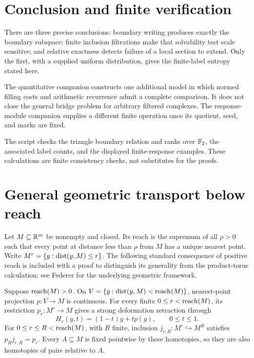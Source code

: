 \documentclass[11pt,a4paper]{article}
\begin{document}
\section{Conclusion and finite verification}

There are three precise conclusions: boundary writing produces exactly
the boundary subspace; finite inclusion filtrations make that solvability
test scale sensitive; and relative exactness detects failure of a local
section to extend.  Only the first, with a supplied uniform distribution,
gives the finite-label entropy stated here.

The quantitative companion constructs one additional model in which
normed filling costs and arithmetic recurrence admit a complete
comparison.  It does not close the general bridge problem for arbitrary
filtered complexes.  The response-module companion supplies a different
finite operation once its quotient, seed, and marks are fixed.

The script  checks the
triangle boundary relation and ranks over $\mathbb F_2$, the associated label
counts, and the displayed finite-response examples.  These calculations
are finite consistency checks, not substitutes for the proofs.

\appendix
\section{General geometric transport below reach}
\label{sec:general-reach}

Let $M\subseteq\mathbb R^m$ be nonempty and closed.  Its reach is the supremum
of all $\rho>0$ such that every point at distance less than $\rho$ from
$M$ has a unique nearest point.  Write
$M^r=\{y:\operatorname{dist}(y,M)\leq r\}$.  The following standard consequence of
positive reach is included with a proof to distinguish its generality
from the product-torus calculation; see Federer \cite[Section 4]{federer}
for the underlying geometric framework.

\begin{lemma}
\label{lem:general-reach}
Suppose $\operatorname{reach}(M)>0$.  On
$V=\{y:\operatorname{dist}(y,M)<\operatorname{reach}(M)\}$, nearest-point projection $p:V\to M$
is continuous.  For every finite $0\leq r<\operatorname{reach}(M)$, its restriction
$p_r:M^r\to M$ gives a strong deformation retraction through
\[
 H_r(y,t)=(1-t)y+t p(y),\qquad 0\leq t\leq1.
\]
For $0\leq r\leq R<\operatorname{reach}(M)$, with $R$ finite, inclusion
$j_{r,R}:M^r\hookrightarrow M^R$ satisfies $p_Rj_{r,R}=p_r$.
Every $A\subseteq M$ is fixed pointwise by these homotopies, so they
are also homotopies of pairs relative to $A$.
\end{lemma}
\end{document}
